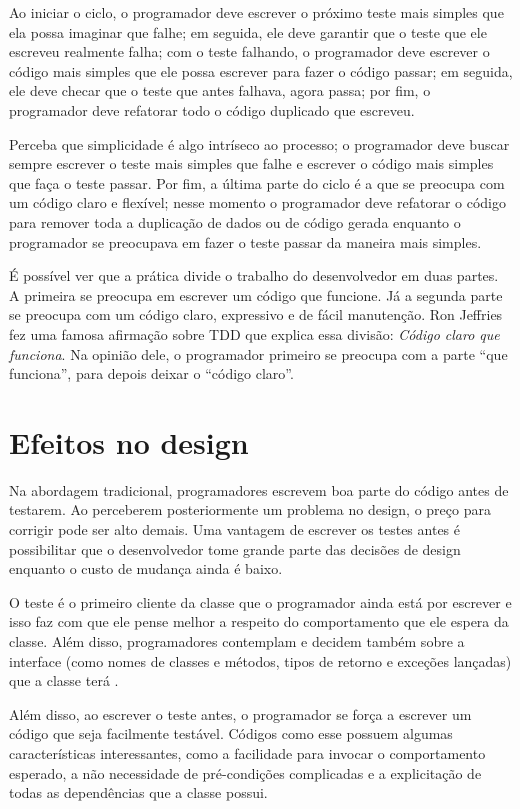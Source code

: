 Ao iniciar o ciclo, o programador deve escrever o próximo teste mais simples que
ela possa imaginar que falhe; em seguida, ele deve garantir que o teste que ele
escreveu realmente falha; com o teste falhando, o programador deve escrever o
código mais simples que ele possa escrever para fazer o código passar; em
seguida, ele deve checar que o teste que antes falhava, agora passa; por fim, o
programador deve refatorar todo o código duplicado que escreveu.

Perceba que simplicidade é algo intríseco ao processo; o programador deve buscar
sempre escrever o teste mais simples que falhe e escrever o código mais simples
que faça o teste passar. Por fim, a última parte do ciclo é a que se preocupa
com um código claro e flexível; nesse momento o programador deve refatorar o
código para remover toda a duplicação de dados ou de código gerada enquanto o
programador se preocupava em fazer o teste passar da maneira mais simples.

É possível ver que a prática divide o trabalho do desenvolvedor em duas partes.
A primeira se preocupa em escrever um código que funcione. Já a segunda parte
se preocupa com um código claro, expressivo e de fácil manutenção. Ron Jeffries
fez uma famosa afirmação sobre TDD que explica essa divisão: \textit{Código
claro que funciona}. Na opinião dele, o programador primeiro se preocupa com a
parte ``que funciona'', para depois deixar o ``código claro''.

\section{Efeitos no design}

Na abordagem tradicional, programadores escrevem boa parte do código antes de
testarem. Ao perceberem posteriormente um problema no design, o preço para
corrigir pode ser alto demais. Uma vantagem de escrever os testes antes é
possibilitar que o desenvolvedor tome grande parte das decisões de design
enquanto o custo de mudança ainda é baixo.

O teste é o primeiro cliente da
classe que o programador ainda está por escrever e isso faz com que ele pense
melhor a respeito do comportamento que ele espera da classe. Além disso,
programadores contemplam e decidem também sobre a interface (como nomes de
classes e métodos, tipos de retorno e exceções lançadas) que a classe terá
\cite{janzen-saiedian}.

Além disso, ao escrever o teste antes, o programador se força a escrever um
código que seja facilmente testável. Códigos como esse possuem algumas
características interessantes, como a facilidade para invocar o comportamento
esperado, a não necessidade de pré-condições complicadas e a explicitação de
todas as dependências que a classe possui.

